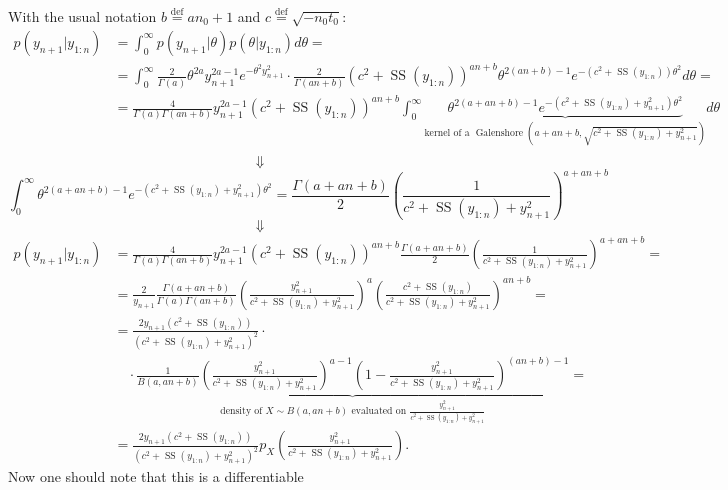 \documentclass[
  11pt,
]{article}
\begin{document}
With the usual notation \(b \stackrel{\text{def}}{=}an_0 + 1\) and
\(c \stackrel{\text{def}}{=}\sqrt{-n_0t_0}\): \begin{align*}
    p(y_{n + 1} | y_{1:n}) & = \int_0^{\infty} p(y_{n + 1} | \theta) p(\theta | y_{1:n}) d\theta = \\
    & = \int_0^{\infty} \frac{2}{\Gamma(a)} \theta^{2a}y_{n + 1}^{2a - 1} e^{-\theta^2y_{n + 1}^2} \cdot \frac{2}{\Gamma(an + b)} \left(c^2 + \operatorname{SS}\left(y_{1:n}\right)\right)^{an + b} \theta^{2(an + b) - 1} e^{-(c^2 + \operatorname{SS}\left(y_{1:n}\right))\theta^2} d\theta =  \\
    & = \frac{4}{\Gamma(a)\Gamma(an + b)} y_{n + 1}^{2a - 1} \left(c^2 + \operatorname{SS}\left(y_{1:n}\right)\right)^{an + b} \int_0^{\infty} \underbrace{\theta^{2(a + an + b) - 1} e^{-(c^2 + \operatorname{SS}\left(y_{1:n}\right) + y_{n + 1}^2)\theta^2}}_{\text{kernel of a } \operatorname{Galenshore}\left(a + an + b, \sqrt{c^2 + \operatorname{SS}\left(y_{1:n}\right) + y_{n + 1}^2}\right)} d\theta \\
\end{align*} \[\Downarrow\] \[
    \int_0^{\infty} \theta^{2(a + an + b) - 1} e^{-(c^2 + \operatorname{SS}\left(y_{1:n}\right) + y_{n + 1}^2)\theta^2} = \frac{\Gamma(a + an + b)}{2} \left(\frac{1}{c^2 + \operatorname{SS}\left(y_{1:n}\right) + y_{n + 1}^2}\right)^{a + an + b}
\] \[\Downarrow\] \begin{align*}
    p(y_{n + 1} | y_{1:n}) & =  \frac{4}{\Gamma(a)\Gamma(an + b)} y_{n + 1}^{2a - 1} \left(c^2 + \operatorname{SS}\left(y_{1:n}\right)\right)^{an + b} \frac{\Gamma(a + an + b)}{2} \left(\frac{1}{c^2 + \operatorname{SS}\left(y_{1:n}\right) + y_{n + 1}^2}\right)^{a + an + b} = \\
    & = \frac{2}{y_{n + 1}} \frac{\Gamma(a + an + b)}{\Gamma(a)\Gamma(an + b)} \left(\frac{y_{n + 1}^2}{c^2 + \operatorname{SS}\left(y_{1:n}\right) + y_{n + 1}^2}\right)^{a} \left(\frac{c^2 + \operatorname{SS}\left(y_{1:n}\right)}{c^2 + \operatorname{SS}\left(y_{1:n}\right) + y_{n + 1}^2}\right)^{an + b} = \\
    & = \frac{2 y_{n + 1} \left(c^2 + \operatorname{SS}\left(y_{1:n}\right)\right)}{\left(c^2 + \operatorname{SS}\left(y_{1:n}\right) + y_{n + 1}^2\right)^2} \cdot \\
    & \quad \cdot \underbrace{\frac{1}{B(a, an + b)} \left(\frac{y_{n + 1}^2}{c^2 + \operatorname{SS}\left(y_{1:n}\right) + y_{n + 1}^2}\right)^{a - 1} \left(1 - \frac{y_{n + 1}^2}{c^2 + \operatorname{SS}\left(y_{1:n}\right) + y_{n + 1}^2}\right)^{(an + b) - 1}}_{\text{density of } X \sim B(a, an + b) \text{ evaluated on } \frac{y_{n + 1}^2}{c^2 + \operatorname{SS}\left(y_{1:n}\right) + y_{n + 1}^2}} = \\
    & = \frac{2 y_{n + 1} \left(c^2 + \operatorname{SS}\left(y_{1:n}\right)\right)}{\left(c^2 + \operatorname{SS}\left(y_{1:n}\right) + y_{n + 1}^2\right)^2} p_X(\frac{y_{n + 1}^2}{c^2 + \operatorname{SS}\left(y_{1:n}\right) + y_{n + 1}^2}).
\end{align*} Now one should note that this is a differentiable
\end{document}

